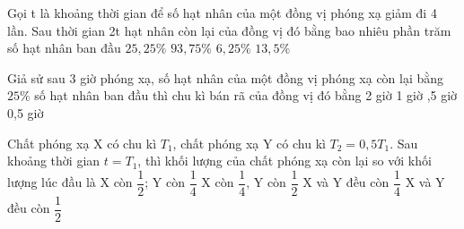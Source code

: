 \begin{vidu}%
Gọi t là khoảng thời gian để số hạt nhân của một đồng vị phóng xạ giảm đi 4 lần. Sau thời gian 2t hạt nhân còn lại của đồng vị đó bằng bao nhiêu phần trăm số hạt nhân ban đầu 
\choice
{$25,25\%$}
{$93,75\%$}
{\True $6,25\%$}
{$13,5\%$}
\end{vidu}
\begin{vidu}%
Giả sử sau 3 giờ phóng xạ, số hạt nhân của một đồng vị phóng xạ còn lại bằng $25\%$ số hạt nhân ban đầu thì chu kì bán rã của đồng vị đó bằng
\choice
{2 giờ}
{1 giờ}
{,5 giờ}
{0,5 giờ}
\end{vidu}
\begin{vidu}%
Chất phóng xạ X có chu kì $T_1$, chất phóng xạ Y có chu kì $T_2=0,5T_1 $. Sau khoảng thời gian $t=T_1 $, thì khối lượng của chất phóng xạ còn lại so với khối lượng lúc đầu là
\choice
{\True X còn $\dfrac{1}{2}$; Y còn $\dfrac{1}{4}$}
{X còn $\dfrac{1}{4}$, Y còn $\dfrac{1}{2}$}
{X và Y đều còn $\dfrac{1}{4}$}
{X và Y đều còn $\dfrac{1}{2}$}
\end{vidu}
